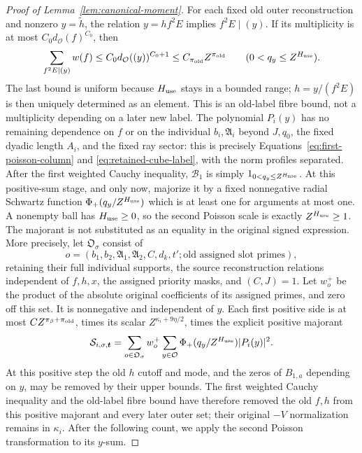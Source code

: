 \documentclass[11pt,a4paper]{article}
\numberwithin{equation}{section}
\numberwithin{figure}{section}
\theoremstyle{definition}
\theoremstyle{remark}
\begin{document}
\begin{proof}[Proof of Lemma~\ref{lem:canonical-moment}]
For each fixed old outer reconstruction and nonzero \(y=\widetilde h\),
the relation \(y=hf^2E\) implies \(f^2E\mid(y)\).  If its multiplicity
is at most \(C_0d_{\mathcal O}(f)^{C_0}\), then
\begin{equation}\label{eq:inverse-old-label-fibre}
 \sum_{f^2E\mid(y)}w(f)
 \le C_0d_{\mathcal O}((y))^{C_0+1}
 \le C_{\pi_{\rm old}}Z^{\pi_{\rm old}}
 \qquad(0<q_y\le Z^{H_{\rm use}}).
\end{equation}
The last bound is uniform because \(H_{\rm use}\) stays in a bounded
range; \(h=y/(f^2E)\) is then uniquely determined as an element.
This is an old-label fibre bound, not a multiplicity depending on a
later new label.
The polynomial \(P_i(y)\) has no remaining dependence on \(f\) or on
the individual \(b_i,\mathfrak A_i\) beyond \(J,q_0\), the fixed
dyadic length \(A_i\), and the fixed ray sector: this is precisely
Equations~\eqref{eq:first-poisson-column} and
\eqref{eq:retained-cube-label}, with the norm profiles separated.
After the first weighted Cauchy inequality, \(\mathcal B_1\) is simply
\(1_{0<q_y\le Z^{H_{\rm use}}}\).  At this positive-sum stage, and only
now, majorize it by a fixed nonnegative radial Schwartz function
\(\Phi_+(q_y/Z^{H_{\rm use}})\) which is at least one for arguments at
most one.  A nonempty ball has \(H_{\rm use}\ge0\), so the second Poisson
scale is exactly \(Z^{H_{\rm use}}\ge1\).  The majorant is not substituted
as an equality in the original signed expression.  More precisely, let
\(\mathfrak O_\sigma\) consist of
\[
 o=(b_1,b_2,\mathfrak A_1,\mathfrak A_2,C,d_k,t';
       \text{old assigned slot primes}),
\]
retaining their full individual supports, the source reconstruction
relations independent of \(f,h,x\), the assigned priority masks, and
\((C,J)=1\).  Let \(w_o^+\) be the product of the absolute original
coefficients of its assigned primes, and zero off this set.  It is
nonnegative and independent of \(y\).  Each first positive side is at
most \(C Z^{\pi_\beta+\pi_{\rm old}}\), times its scalar
\(Z^{\kappa_i+9\eta/2}\), times the explicit positive majorant
\begin{equation}\label{eq:inverse-first-majorant}
 \mathcal S_{i,\sigma,\boldsymbol t}
 =\sum_{o\in\mathfrak O_\sigma}w_o^+
    \sum_{y\in\mathcal O}\Phi_+(q_y/Z^{H_{\rm use}})|P_i(y)|^2.
\end{equation}
At this positive step the old \(h\) cutoff and mode, and the zeros of
\(B_{1,a}\) depending on \(y\), may be removed by their upper bounds.
The first weighted Cauchy inequality and the old-label fibre bound have
therefore removed the old \(f,h\) from this positive majorant and every
later outer set; their original \(-V\) normalization remains in
\(\kappa_i\).  After the following count, we apply the second Poisson
transformation to its \(y\)-sum.


\end{proof}
\end{document}
